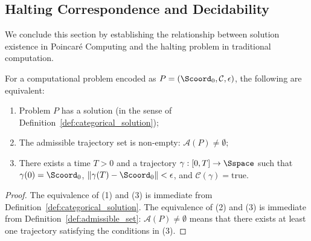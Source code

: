 \subsection{Halting Correspondence and Decidability}

We conclude this section by establishing the relationship between solution existence in Poincaré Computing and the halting problem in traditional computation.

\begin{theorem}
\label{thm:halting_correspondence}
For a computational problem encoded as $P = (\Scoord_0, \mathcal{C}, \epsilon)$, the following are equivalent:
\begin{enumerate}
    \item Problem $P$ has a solution (in the sense of Definition~\ref{def:categorical_solution});
    \item The admissible trajectory set is non-empty: $\mathcal{A}(P) \neq \emptyset$;
    \item There exists a time $T > 0$ and a trajectory $\gamma: [0,T] \to \Sspace$ such that $\gamma(0) = \Scoord_0$, $\|\gamma(T) - \Scoord_0\| < \epsilon$, and $\mathcal{C}(\gamma) = \text{true}$.
\end{enumerate}
\end{theorem}

\begin{proof}
The equivalence of (1) and (3) is immediate from Definition~\ref{def:categorical_solution}. The equivalence of (2) and (3) is immediate from Definition~\ref{def:admissible_set}: $\mathcal{A}(P) \neq \emptyset$ means that there exists at least one trajectory satisfying the conditions in (3).
\end{proof}

